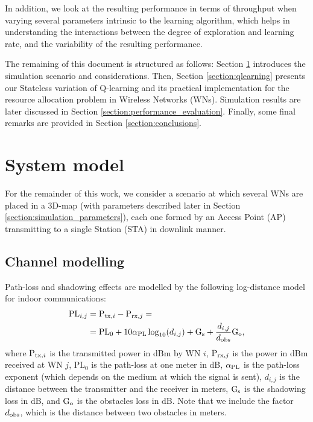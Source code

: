 \documentclass[conference]{IEEEtran}
\begin{document}
	In addition, we look at the resulting performance in terms of throughput when varying several parameters intrinsic to the learning algorithm, which helps in understanding the interactions between the degree of exploration and learning rate, and the variability of the resulting performance. 
	
	The remaining of this document is structured as follows: Section \ref{section:system_model} introduces the simulation scenario and considerations. Then, Section \ref{section:qlearning} presents our Stateless variation of Q-learning and its practical implementation for the resource allocation problem in Wireless Networks (WNs). Simulation results are later discussed in Section \ref{section:performance_evaluation}. Finally, some final remarks are provided in Section \ref{section:conclusions}. 
	
	\section{System model}
	\label{section:system_model}	
	
	For the remainder of this work, we consider a scenario at which several WNs are placed in a 3D-map (with parameters described later in Section \ref{section:simulation_parameters}), each one formed by an Access Point (AP) transmitting to a single Station (STA) in downlink manner. 
	
	\subsection{Channel modelling}
	\label{section:channel_modelling}	
	
	Path-loss and shadowing effects are modelled by the following log-distance model for indoor communications:	
	\begin{align}
	\text{PL}_{i,j} &= \text{P}_{{\rm tx},i} - \text{P}_{{\rm rx},j} = \nonumber \\ & = \text{PL}_0 + 10  \alpha_{\rm PL}  \log_{10}(d_{i,j}) + \text{G}_{{\rm s}} + \frac{d_{i,j}}{d_{{\rm obs}}} \text{G}_{{\rm o}}, \nonumber
	\end{align}
	where $\text{P}_{{\rm tx},i}$ is the transmitted power in dBm by WN $i$, $\text{P}_{{\rm rx},j}$ is the power in dBm received at WN $j$, $\text{PL}_0$ is the path-loss at one meter in dB, $\alpha_{\rm PL}$ is the path-loss exponent (which depends on the medium at which the signal is sent), $d_{i,j}$ is the distance between the transmitter and the receiver in meters, $\text{G}_{{\rm s}}$ is the shadowing loss in dB, and $\text{G}_{{\rm o}}$ is the obstacles loss in dB. Note that we include the factor $d_{{\rm obs}}$, which is the distance between two obstacles in meters. 
	
\end{document}
